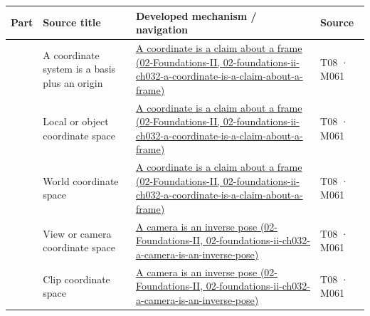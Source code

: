 {\def\LTcaptype{none} %
\begin{longtable}[]{@{}
  >{\raggedleft\arraybackslash}p{}
  >{\raggedright\arraybackslash}p{}
  >{\raggedright\arraybackslash}p{}
  >{\raggedright\arraybackslash}p{}@{}}
\toprule\noalign{}
\begin{minipage}[b]{\linewidth}\raggedleft
Part
\end{minipage} & \begin{minipage}[b]{\linewidth}\raggedright
Source title
\end{minipage} & \begin{minipage}[b]{\linewidth}\raggedright
Developed mechanism / navigation
\end{minipage} & \begin{minipage}[b]{\linewidth}\raggedright
Source
\end{minipage} \\
\midrule\noalign{}
\endhead
\bottomrule\noalign{}
\endlastfoot
1001 & A coordinate system is a basis plus an origin & \href{../02-Foundations-II/main.pdf\#nameddest=02-foundations-ii-ch032-a-coordinate-is-a-claim-about-a-frame}{A coordinate is a claim about a frame (02-Foundations-II, 02-foundations-ii-ch032-a-coordinate-is-a-claim-about-a-frame)} & T08 · M061 \\
1002 & Local or object coordinate space & \href{../02-Foundations-II/main.pdf\#nameddest=02-foundations-ii-ch032-a-coordinate-is-a-claim-about-a-frame}{A coordinate is a claim about a frame (02-Foundations-II, 02-foundations-ii-ch032-a-coordinate-is-a-claim-about-a-frame)} & T08 · M061 \\
1003 & World coordinate space & \href{../02-Foundations-II/main.pdf\#nameddest=02-foundations-ii-ch032-a-coordinate-is-a-claim-about-a-frame}{A coordinate is a claim about a frame (02-Foundations-II, 02-foundations-ii-ch032-a-coordinate-is-a-claim-about-a-frame)} & T08 · M061 \\
1004 & View or camera coordinate space & \href{../02-Foundations-II/main.pdf\#nameddest=02-foundations-ii-ch032-a-camera-is-an-inverse-pose}{A camera is an inverse pose (02-Foundations-II, 02-foundations-ii-ch032-a-camera-is-an-inverse-pose)} & T08 · M061 \\
1005 & Clip coordinate space & \href{../02-Foundations-II/main.pdf\#nameddest=02-foundations-ii-ch032-a-camera-is-an-inverse-pose}{A camera is an inverse pose (02-Foundations-II, 02-foundations-ii-ch032-a-camera-is-an-inverse-pose)} & T08 · M061 \\

\end{longtable}}
